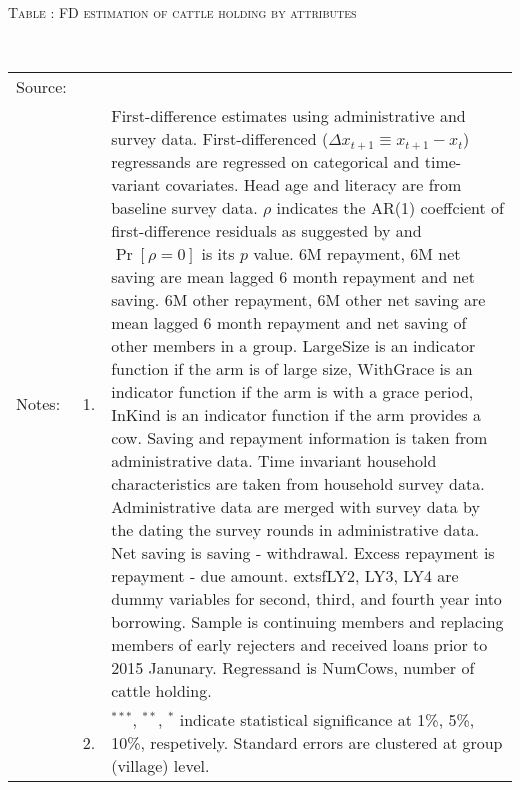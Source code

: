 \hspace{-1cm}\begin{minipage}[t]{14cm}
\hfil\textsc{\normalsize Table \thetable: FD estimation of cattle holding by attributes\label{tab FD cow attributes original HH}}\\
\setlength{\tabcolsep}{1pt}
\setlength{\baselineskip}{8pt}
\renewcommand{\arraystretch}{.55}
\hfil{}\\
\renewcommand{\arraystretch}{.8}
\setlength{\tabcolsep}{1pt}
\begin{tabular}{>{\hfill\scriptsize}p{1cm}<{}>{\hfill\scriptsize}p{.25cm}<{}>{\scriptsize}p{12cm}<{\hfill}}
Source:& \multicolumn{2}{l}{\scriptsize Estimated with GUK administrative and survey data.}\\
Notes: & 1. & First-difference estimates using administrative and survey data. First-differenced ($\Delta x_{t+1}\equiv x_{t+1} - x_{t}$) regressands are regressed on categorical and time-variant covariates. Head age and literacy are from baseline survey data. $\rho$ indicates the AR(1) coeffcient of first-difference residuals as suggested by \citet[][10.71]{Wooldridge2010} and $\Pr[\rho=0]$ is its $p$ value. \textsf{6M repayment, 6M net saving} are mean lagged 6 month repayment and net saving. \textsf{6M other repayment, 6M other net saving} are mean lagged 6 month repayment and net saving of other members in a group. \textsf{LargeSize} is an indicator function if the arm is of large size, \textsf{WithGrace} is an indicator function if the arm is with a grace period, \textsf{InKind} is an indicator function if the arm provides a cow. Saving and repayment information is taken from administrative data. Time invariant household characteristics are taken from household survey data. Administrative data are merged with survey data by the dating the survey rounds in administrative data. Net saving is saving - withdrawal. Excess repayment is repayment - due amount. 	extsf{LY2, LY3, LY4} are dummy variables for second, third, and fourth year into borrowing. Sample is continuing members and replacing members of early rejecters and received loans prior to 2015 Janunary. Regressand is \textsf{NumCows}, number of cattle holding. \\
& 2. & ${}^{***}$, ${}^{**}$, ${}^{*}$ indicate statistical significance at 1\%, 5\%, 10\%, respetively. Standard errors are clustered at group (village) level.
\end{tabular}
\end{minipage}

